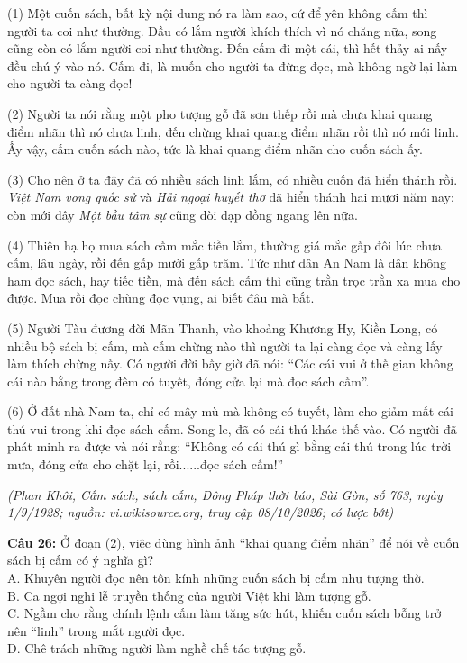 \documentclass[12pt,a4paper]{article}
\begin{document}
\par\nobreak

(1) Một cuốn sách, bất kỳ nội dung nó ra làm sao, cứ để yên không cấm thì người ta coi như thường. Dầu có lắm người khích thích vì nó chăng nữa, song cũng còn có lắm người coi như thường. Đến cấm đi một cái, thì hết thảy ai nấy đều chú ý vào nó. Cấm đi, là muốn cho người ta đừng đọc, mà không ngờ lại làm cho người ta càng đọc!

(2) Người ta nói rằng một pho tượng gỗ đã sơn thếp rồi mà chưa khai quang điểm nhãn thì nó chưa linh, đến chừng khai quang điểm nhãn rồi thì nó mới linh. Ấy vậy, cấm cuốn sách nào, tức là khai quang điểm nhãn cho cuốn sách ấy.

(3) Cho nên ở ta đây đã có nhiều sách linh lắm, có nhiều cuốn đã hiển thánh rồi. \textit{Việt Nam vong quốc sử} và \textit{Hải ngoại huyết thơ} đã hiển thánh hai mươi năm nay; còn mới đây \textit{Một bầu tâm sự} cũng đòi đạp đồng ngang lên nữa.

(4) Thiên hạ họ mua sách cấm mắc tiền lắm, thường giá mắc gấp đôi lúc chưa cấm, lâu ngày, rồi đến gấp mười gấp trăm. Tức như dân An Nam là dân không ham đọc sách, hay tiếc tiền, mà đến sách cấm thì cũng trằn trọc trằn xa mua cho được. Mua rồi đọc chùng đọc vụng, ai biết đâu mà bắt.

(5) Người Tàu đương đời Mãn Thanh, vào khoảng Khương Hy, Kiền Long, có nhiều bộ sách bị cấm, mà cấm chừng nào thì người ta lại càng đọc và càng lấy làm thích chừng nấy. Có người đời bấy giờ đã nói: ``Các cái vui ở thế gian không cái nào bằng trong đêm có tuyết, đóng cửa lại mà đọc sách cấm''.

(6) Ở đất nhà Nam ta, chỉ có mây mù mà không có tuyết, làm cho giảm mất cái thú vui trong khi đọc sách cấm. Song le, đã có cái thú khác thế vào. Có người đã phát minh ra được và nói rằng: ``Không có cái thú gì bằng cái thú trong lúc trời mưa, đóng cửa cho chặt lại, rồi......đọc sách cấm!''
\begin{flushright}\small\textit{(Phan Khôi, Cấm sách, sách cấm, Đông Pháp thời báo, Sài Gòn, số 763, ngày 1/9/1928; nguồn: vi.wikisource.org, truy cập 08/10/2026; có lược bớt)}\end{flushright}

\par\nobreak


\noindent \textbf{Câu 26:} Ở đoạn (2), việc dùng hình ảnh ``khai quang điểm nhãn'' để nói về cuốn sách bị cấm có ý nghĩa gì?\\
\noindent A. Khuyên người đọc nên tôn kính những cuốn sách bị cấm như tượng thờ.\\
\noindent B. Ca ngợi nghi lễ truyền thống của người Việt khi làm tượng gỗ.\\
\noindent C. Ngầm cho rằng chính lệnh cấm làm tăng sức hút, khiến cuốn sách bỗng trở nên ``linh'' trong mắt người đọc.\\
\noindent D. Chê trách những người làm nghề chế tác tượng gỗ.
\end{document}
